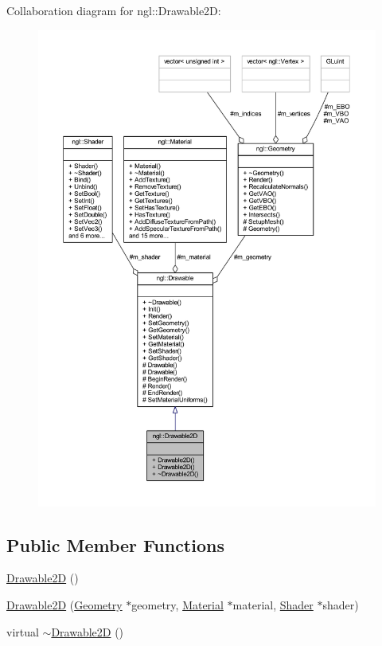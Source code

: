 Collaboration diagram for ngl\+:\+:Drawable2D\+:
\nopagebreak
\begin{figure}[H]
\begin{center}
\leavevmode
\includegraphics[width=350pt]{classngl_1_1_drawable2_d__coll__graph}
\end{center}
\end{figure}
\subsection*{Public Member Functions}
\begin{DoxyCompactItemize}
\item 
\mbox{\hyperlink{classngl_1_1_drawable2_d_a584ea95db37c4c66c85c1b18b53a973d}{Drawable2D}} ()
\item 
\mbox{\hyperlink{classngl_1_1_drawable2_d_a27d0cff4f875481d1accd04946ac1159}{Drawable2D}} (\mbox{\hyperlink{classngl_1_1_geometry}{Geometry}} $\ast$geometry, \mbox{\hyperlink{classngl_1_1_material}{Material}} $\ast$material, \mbox{\hyperlink{classngl_1_1_shader}{Shader}} $\ast$shader)
\item 
virtual \mbox{\hyperlink{classngl_1_1_drawable2_d_a806b81514a9bf7761f1099390b0a78a2}{$\sim$\+Drawable2D}} ()
\end{DoxyCompactItemize}
